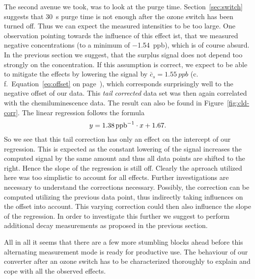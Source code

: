 The second avenue we took, was to look at the purge time.
Section~\ref{sec:switch} suggests that \SI{30}{\second} purge time is
not enough after the ozone switch has been turned off. Thus we can
expect the measured  intensities to be too large. One
observation pointing towards the influence of this effect ist, that we
measured negative  concentrations (to a minimum of
\SI{-1.54}{ppb}), which is of course absurd. In the previous section
we suggest, that the surplus  signal does not depend too
strongly on the  concentration. If this assumption is correct,
we expect to be able to mitigate the effects by lowering the 
signal by $\bar c_s = \SI{1.55}{ppb}$ (c.\,f.\
Equation~\eqref{eq:offset} on page~\pageref{eq:offset}), which
corresponds surprisingly well to the negative offset of our data. This
\emph{tail corrected} data set was then again correlated with the
chemiluminescence data. The result can also be found in
Figure~\ref{fig:cld-corr}. The linear regression follows the formula
\begin{align*}
  y = \SI{1.38}{ppb\tothe{-1}} \cdot x + 1.67.
\end{align*}
So we see that this tail correction has only an effect on the
intercept of our regression. This is expected as the constant lowering
of the \ch{NO2} signal increases the computed \ch{NO} signal by the
same amount and thus all data points are shifted to the
right. Hence the slope of the regression is still off. Clearly the
aprroach utilized here was too simplistic to account for all
effects. Further investigations are necessary to understand the
corrections necessary. Possibly, the  correction can be
computed utilizing the previous  data point, thus indirectly
taking \ch{NO} influences on the offset into account. This varying 
correction could then also influence the slope of the
regression. In order to investigate this further we suggest to perform
additional decay measurements as proposed in the previous section.

All in all it seems that there are a few more stumbling blocks ahead
before this alternating measurement mode is ready for productive
use. The behaviour of our converter after an ozone switch has to be
characterized thoroughly to explain and cope with all the observed
effects.

